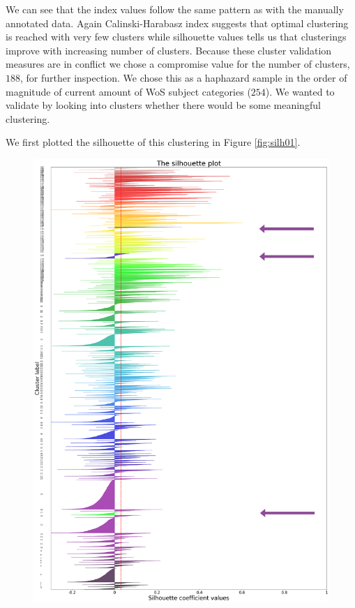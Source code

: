 We can see that the index values follow the same pattern as with 
the manually annotated data. Again Calinski-Harabasz index 
suggests that optimal clustering is reached with very few clusters
while silhouette values tells us that clusterings improve with 
increasing number of clusters. Because these cluster validation 
measures are in conflict we chose a compromise value for the 
number of clusters, $188$, for further inspection. We chose this 
as a haphazard sample in the order of magnitude of current amount 
of WoS subject categories ($254$).
We wanted to validate by looking into clusters whether there would
be some meaningful clustering.

We first plotted the silhouette of this clustering in Figure 
\ref{fig:silh01}.
\begin{figure}[htp]
  \begin{center}    
\includegraphics[width=13cm]{images/21155-188-800-hierarchical-silhouette_arrows.png}

\end{center}
\end{figure}
